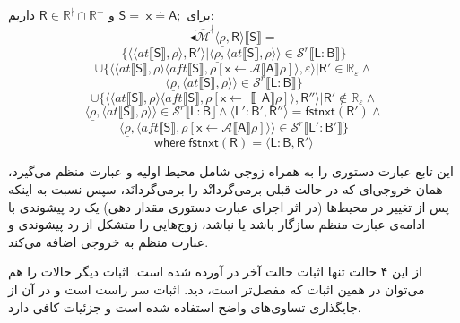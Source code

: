 برای $\mathsf{S=\;x \doteq A;}$ و $\mathsf{R} \in \mathbb{R^\nmid} \cap \mathbb{R^+}$ داریم:
$$\blacktriangleleft\mathcal{\hat{M}^\nmid} \langle \underline{\rho}, \mathsf{R} \rangle \llbracket \mathsf{S} \rrbracket
=$$
$$\{
\langle \langle at \llbracket \mathsf{S} \rrbracket, \rho \rangle , \mathsf{R'} \rangle |
\langle \underline{\rho}, \langle at \llbracket \mathsf{S} \rrbracket, \rho \rangle \rangle \in \mathcal{S}^r \llbracket \mathsf{L:B} \rrbracket \}$$
$$\cup \{ \langle \langle at \llbracket \mathsf{S} \rrbracket , \rho \rangle  \langle aft \llbracket \mathsf{S} \rrbracket, 
\rho [\mathsf{x}\leftarrow \mathcal{A}\llbracket \mathsf{A} \rrbracket \rho ]\rangle , \varepsilon \rangle | \mathsf{R'} \in \mathbb{R_\varepsilon} \land$$
$$
\langle \underline{\rho}, \langle at \llbracket \mathsf{S} \rrbracket , \rho \rangle \rangle \in 
\mathcal{S}^r \llbracket \mathsf{L:B} \rrbracket
\}$$
$$\cup \{
\langle \langle at \llbracket \mathsf{S} \rrbracket , \rho \rangle \langle aft \llbracket \mathsf{S} \rrbracket , \rho [\mathsf{x} \leftarrow \mathcal \llbracket \mathsf{A}\rrbracket \rho]\rangle, \mathsf{R''}\rangle | \mathsf{R'} \notin \mathbb{R_\varepsilon} \land$$
$$\langle \underline{\rho},\langle at \llbracket \mathsf{S} \rrbracket , \rho \rangle \rangle \in \mathcal{S}^r \llbracket \mathsf{L:B} \rrbracket \land \langle \mathsf{L':B',R''} \rangle = 
\mathsf{fstnxt(R') }\land$$
$$\langle \underline{\rho}, \langle aft \llbracket \mathsf{S} \rrbracket,\rho 
[\mathsf{x} \leftarrow \mathcal{A}\llbracket \mathsf{A} \rrbracket \rho]\rangle \rangle \in 
\mathcal{S}^r \llbracket \mathsf{L':B'} \rrbracket
\}$$
$$\mathsf{where \; fstnxt(R)=\langle L:B,R' \rangle}$$

این تابع عبارت‌ دستوری را به همراه زوجی شامل محیط اولیه و عبارت منظم می‌گیرد، همان خروجی‌ای که در حالت قبلی برمی‌گردانْد را برمی‌گردانَد، سپس نسبت به اینکه پس از تغییر در محیط‌ها (در اثر اجرای عبارت‌ دستوری مقدار دهی) یک رد پیشوندی با ادامه‌ی عبارت منظم سازگار باشد یا نباشد، زوج‌هایی را متشکل از رد پیشوندی و عبارت منظم به خروجی اضافه می‌کند.

از این ۴ حالت تنها اثبات حالت آخر در \cite{calcul} آورده شده است. اثبات دیگر حالات را هم می‌توان در همین اثبات که مفصل‌تر است، دید. اثبات سر راست است و در آن از جایگذاری تساوی‌های واضح استفاده شده است و جزئیات کافی دارد.

